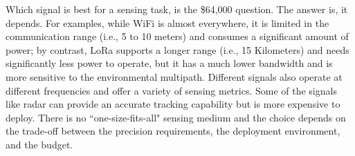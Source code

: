 Which signal is best for a sensing task, is the \$64,000 question. The answer is, it depends. For examples, while WiFi is almost
everywhere, it is limited in the communication range (i.e., 5 to 10 meters) and consumes a significant amount of power; by contrast, LoRa
supports a longer range (i.e., 15 Kilometers) and needs significantly less power to operate, but it has a much lower bandwidth and is more
sensitive to the environmental multipath. Different signals also operate at different frequencies and offer a variety of sensing metrics.
Some of the signals like \FMCW radar can provide an accurate tracking capability but is more expensive to deploy. There is  no
``one-size-fits-all" sensing medium and the choice depends on the trade-off between the precision requirements, the deployment environment,
and the budget.
